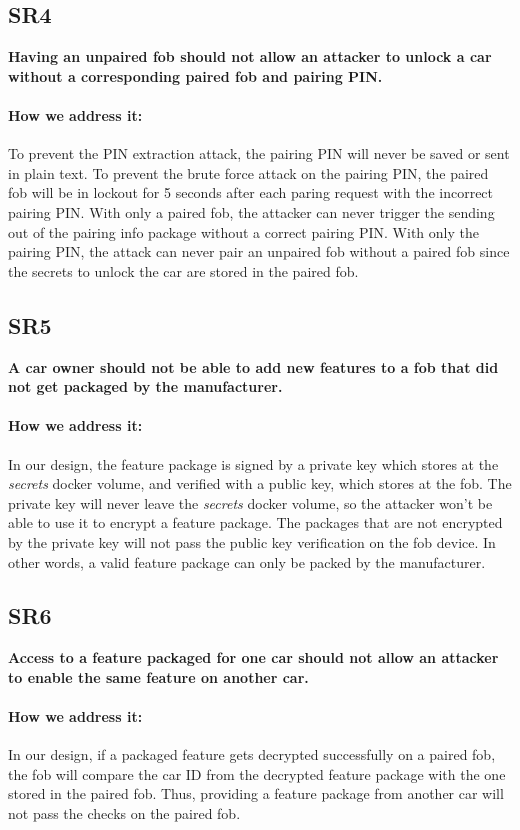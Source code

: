 \documentclass[11pt,oneside,onecolumn,letterpaper]{article}
\begin{document}
\subsection{SR4}
\textbf{Having an unpaired fob should not allow an attacker to unlock a car without a corresponding paired fob and pairing PIN.}

\paragraph{How we address it:}
To prevent the PIN extraction attack, the pairing PIN will never be saved or sent in plain text.
To prevent the brute force attack on the pairing PIN, the paired fob will be in lockout for 5 seconds after each paring request with the incorrect pairing PIN.
With only a paired fob, the attacker can never trigger the sending out of the pairing info package without a correct pairing PIN.
With only the pairing PIN, the attack can never pair an unpaired fob without a paired fob since the secrets to unlock the car are stored in the paired fob.

\subsection{SR5}
\textbf{A car owner should not be able to add new features to a fob that did not get packaged by the manufacturer.}

\paragraph{How we address it:}
In our design, the feature package is signed by a private key which stores at the \textit{secrets} docker volume, and verified with a public key, which stores at the fob.
The private key will never leave the \textit{secrets} docker volume, so the attacker won't be able to use it to encrypt a feature package.
The packages that are not encrypted by the private key will not pass the public key verification on the fob device.
In other words, a valid feature package can only be packed by the manufacturer.

\subsection{SR6}
\textbf{Access to a feature packaged for one car should not allow an attacker to enable the same feature on another car.}

\paragraph{How we address it:}
In our design, if a packaged feature gets decrypted successfully on a paired fob, the fob will compare the car ID from the decrypted feature package with the one stored in the paired fob.
Thus, providing a feature package from another car will not pass the checks on the paired fob.
\end{document}
